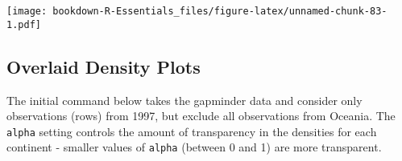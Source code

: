 \documentclass[
]{book}
\newenvironment{Shaded}{\begin{snugshade}}{\end{snugshade}}
\newcommand{\CommentTok}[1]{\textcolor[rgb]{0.56,0.35,0.01}{\textit{#1}}}
\newcommand{\DataTypeTok}[1]{\textcolor[rgb]{0.13,0.29,0.53}{#1}}
\newcommand{\DecValTok}[1]{\textcolor[rgb]{0.00,0.00,0.81}{#1}}
\newcommand{\FloatTok}[1]{\textcolor[rgb]{0.00,0.00,0.81}{#1}}
\newcommand{\KeywordTok}[1]{\textcolor[rgb]{0.13,0.29,0.53}{\textbf{#1}}}
\newcommand{\NormalTok}[1]{#1}
\newcommand{\OperatorTok}[1]{\textcolor[rgb]{0.81,0.36,0.00}{\textbf{#1}}}
\newcommand{\StringTok}[1]{\textcolor[rgb]{0.31,0.60,0.02}{#1}}
\begin{document}
\begin{Shaded}
\end{Shaded}

\texttt{[image: bookdown-R-Essentials\_files/figure-latex/unnamed-chunk-83-1.pdf]}

\hypertarget{overlaid-density-plots}{%
\subsection{Overlaid Density Plots}\label{overlaid-density-plots}}

The initial command below takes the gapminder data and consider only observations (rows) from 1997, but exclude all observations from Oceania. The \texttt{alpha} setting controls the amount of transparency in the densities for each continent - smaller values of \texttt{alpha} (between 0 and 1) are more transparent.
\end{document}
